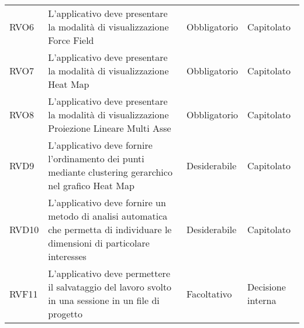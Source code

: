 \begin{longtable}[H]{|>{\raggedright\arraybackslash}p{20mm} | p{90mm} | p{22mm} | p{30mm} |}
    RVO6
        & L'applicativo deve presentare la modalità di visualizzazione Force Field
        & Obbligatorio
        & Capitolato \\
    
    RVO7
        & L'applicativo deve presentare la modalità di visualizzazione Heat Map
        & Obbligatorio
        & Capitolato \\
    
    RVO8
        & L'applicativo deve presentare la modalità di visualizzazione Proiezione Lineare Multi Asse
        & Obbligatorio
        & Capitolato \\

    RVD9
        & L'applicativo deve fornire l'ordinamento dei punti mediante clustering gerarchico nel grafico Heat Map
        & Desiderabile
        & Capitolato \\

    RVD10
        & L'applicativo deve fornire un metodo di analisi automatica che permetta di individuare le dimensioni di particolare interesses
        & Desiderabile
        & Capitolato \\

    RVF11
        & L'applicativo deve permettere il salvataggio del lavoro svolto in una sessione in un file di progetto
        & Facoltativo
        & Decisione interna \\
\end{longtable}
